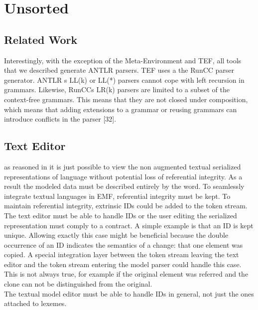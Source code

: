 \chapter{Unsorted}

\section{Related Work}
Interestingly, with the exception of the Meta-Environment
and TEF, all tools that we described generate ANTLR
parsers. TEF uses a the RunCC parser generator. ANTLR s
LL(k) or LL(*) parsers cannot cope with left recursion in
grammars. Likewise, RunCCs LR(k) parsers are limited to
a subset of the context-free grammars. This means that they
are not closed under composition, which means that adding
extensions to a grammar or reusing grammars can introduce
conflicts in the parser [32]. 

\section{Text Editor}
as reasoned in  it is just possible to view the non augmented textual serialized representations of language without potential loss of referential integrity. As a result the modeled data must be described entirely by the word. To seamlessly integrate textual languages in EMF, referential integrity must be kept. To maintain referential integrity, extrinsic IDs could be added  to the token stream. The text editor must be able to handle IDs or the user editing the serialized representation must comply to a contract. A simple example is that an ID is kept unique. Allowing exactly this case might be beneficial because the double occurrence  of an ID indicates the semantics of a change: that one element was copied. A special integration layer between the token stream leaving the text editor and the token stream entering the model parser could handle this case. This is not always true, for example if the original element was referred and the clone can not be distinguished from the original. \\
The textual model editor must be able to handle IDs in general, not just the ones attached to lexemes. 






